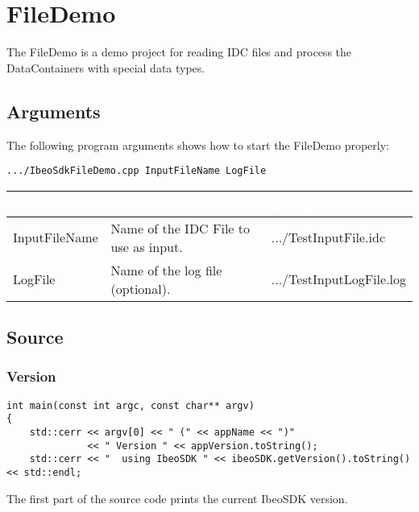 \section{FileDemo}
The FileDemo is a demo project for reading IDC files and process the DataContainers with special data types.

\subsection{Arguments}
The following program arguments shows how to start the FileDemo properly: \\
\begin{lstlisting}[numbers=none]
.../IbeoSdkFileDemo.cpp InputFileName LogFile
\end{lstlisting}
\begin{table}[!htbp]
	\begin{center}
		\renewcommand{\arraystretch}{1.5}
		\begin{tabularx}{\textwidth}{| p{} | p{} | X |}
			\hline
			\cellcolor{ibeo_red} \textcolor{white}{\textbf{Argument}} & \cellcolor{ibeo_red} \textcolor{white}{\textbf{Purpose}} & \cellcolor{ibeo_red} \textcolor{white}{\textbf{Example}} \\
			
			\hline
			InputFileName & Name of the IDC File to use as input. & .../TestInputFile.idc
			\\
			
			\hline
			LogFile & Name of the log file (optional). & .../TestInputLogFile.log
			\\
			
			\hline
		\end{tabularx}
	\end{center}
\end{table}
\subsection{Source}
\subsubsection{Version}
\begin{lstlisting}
int main(const int argc, const char** argv)
{
    std::cerr << argv[0] << " (" << appName << ")"
	    	  << " Version " << appVersion.toString();
    std::cerr << "  using IbeoSDK " << ibeoSDK.getVersion().toString() << std::endl;
\end{lstlisting}
The first part of the source code prints the current IbeoSDK version.
